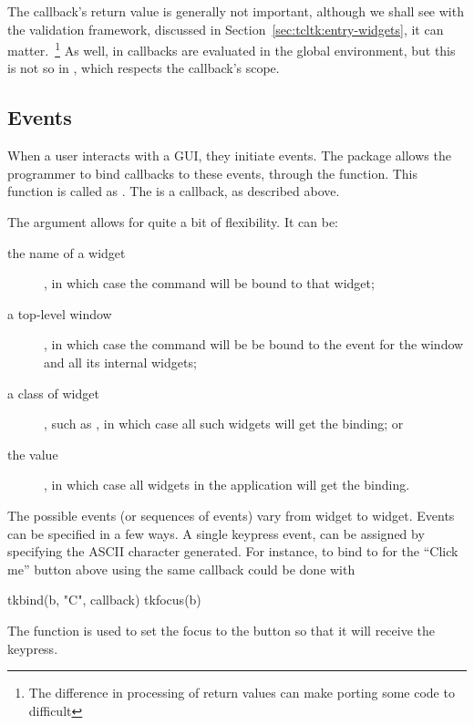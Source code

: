 The callback's return value is generally not important, although we
shall see with the validation framework, discussed in
Section~\ref{sec:tcltk:entry-widgets}, it can matter.~\footnote{The
  difference in processing of return values can make porting some
  \Tk\/ code to  difficult} As well, in \Tk\/ callbacks are
evaluated in the global environment, but this is not so in
, which respects the callback's scope.



\subsection{Events}
\label{sec:tcltk:events}


When a user interacts with a GUI, they initiate events. The  package allows the programmer to bind callbacks to these events, through the  function. This function is called as . The  is a callback, as described above.

The  argument allows for quite a bit of flexibility. It can be:

\begin{description}
\item[the name of a widget], in which case the command will be bound to that widget;
\item[a top-level window], in which case the command will be be bound to the event for the window and all its internal widgets;

\item[a class of widget], such as , in which case all such widgets will get the binding; or 
\item[the value ], in which case all widgets in the application will get the binding.
\end{description}
The possible events (or sequences of events) vary from widget to widget. Events can be specified in a few ways. A single keypress event, can be assigned by specifying the ASCII character generated. For instance, to bind to   for the ``Click me'' button above using the same callback could be done with
\begin{Schunk}
\begin{Sinput}
  tkbind(b, "C", callback)
  tkfocus(b)
\end{Sinput}
\end{Schunk}
The  function is used to set the focus to the button so that it will receive the keypress.

